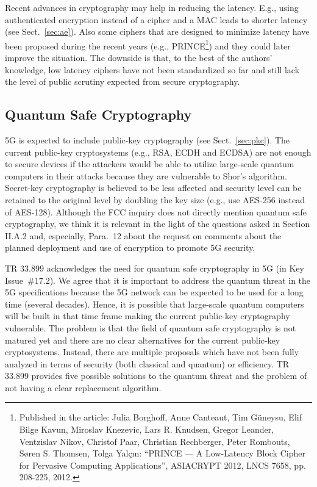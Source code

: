 \documentclass[lnicst,sechang,a4paper]{svmultln}
\begin{document}
Recent advances in cryptography may help in reducing the latency. E.g., using authenticated encryption instead of a cipher and a MAC leads to shorter latency (see Sect.~\ref{sec:ae}). Also some ciphers that are designed to minimize latency have been proposed during the recent years (e.g., PRINCE\footnote{Published in the article: Julia Borghoff, Anne Canteaut, Tim Güneysu, Elif Bilge Kavun, Miroslav Knezevic, Lars R. Knudsen, Gregor Leander, Ventzislav Nikov, Christof Paar, Christian Rechberger, Peter Rombouts, Søren S. Thomsen, Tolga Yalçın: ``PRINCE --- A Low-Latency Block Cipher for Pervasive Computing Applications'', ASIACRYPT 2012, LNCS 7658, pp. 208-225, 2012.}) and they could later improve the situation. The downside is that, to the best of the authors' knowledge, low latency ciphers have not been standardized so far and still lack the level of public scrutiny expected from secure cryptography.

\subsection{Quantum Safe Cryptography}
\label{sec:qsc}

5G is expected to include public-key cryptography (see Sect.~\ref{sec:pkc}). The current public-key cryptosystems (e.g., RSA, ECDH and ECDSA) are not enough to secure devices if the attackers would be able to utilize large-scale quantum computers in their attacks because they are vulnerable to Shor's algorithm. %
Secret-key cryptography is believed to be less affected and security level can be retained to the original level by doubling the key size (e.g., use AES-256 instead of AES-128). Although the FCC inquiry does not directly mention quantum safe cryptography, we think it is relevant in the light of the questions asked in Section II.A.2 and, especially, Para.~12 about the request on comments about the planned deployment and use of encryption to promote 5G security.

TR 33.899 acknowledges the need for quantum safe cryptography in 5G (in Key Issue~\#17.2). We agree that it is important to address the quantum threat in the 5G specifications because the 5G network can be expected to be used for a long time (several decades). Hence, it is possible that large-scale quantum computers will be built in that time frame making the current public-key cryptography vulnerable. The problem is that the field of quantum safe cryptography is not matured yet and there are no clear alternatives for the current public-key cryptosystems. Instead, there are multiple proposals which have not been fully analyzed in terms of security (both classical and quantum) or efficiency. TR 33.899 provides five possible solutions to the quantum threat and the problem of not having a clear replacement algorithm.
\end{document}

